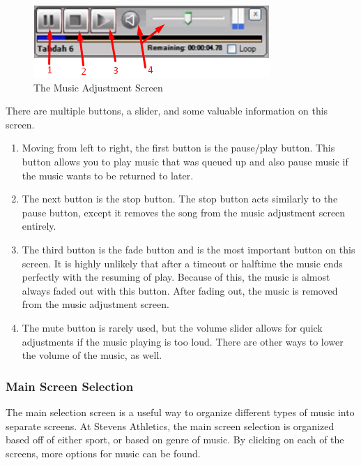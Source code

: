 \documentclass{article}
\begin{document}
\begin{figure}[h]
\begin{center}
\includegraphics[]{images/adjustment.png}
\caption{The Music Adjustment Screen}
\end{center}
\end{figure}

There are multiple buttons, a slider, and some valuable information on this screen. 

\begin{enumerate}
    \item  Moving from left to right, the first button is the pause/play button. This button allows you to play music that was queued up and also pause music if the music wants to be returned to later. 
    \item The next button is the stop button. The stop button acts similarly to the pause button, except it removes the song from the music adjustment screen entirely. 
    \item The third button is the fade button and is the most important button on this screen. It is highly unlikely that after a timeout or halftime the music ends perfectly with the resuming of play. Because of this, the music is almost always faded out with this button. After fading out, the music is removed from the music adjustment screen. 
    \item The mute button is rarely used, but the volume slider allows for quick adjustments if the music playing is too loud. There are other ways to lower the volume of the music, as well. 
\end{enumerate}

\subsubsection{Main Screen Selection}
The main selection screen is a useful way to organize different types of music into separate screens. At Stevens Athletics, the main screen selection is organized based off of either sport, or based on genre of music. By clicking on each of the screens, more options for music can be found. 
\end{document}
